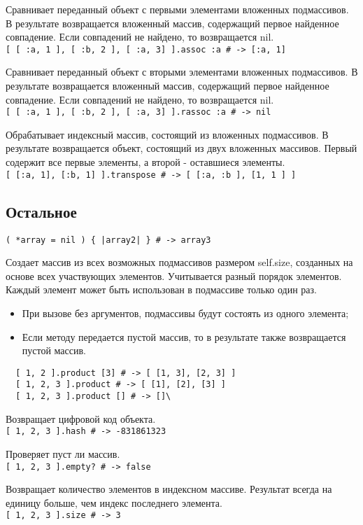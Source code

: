 \begin{methodlist}
  Сравнивает переданный объект с первыми элементами вложенных подмассивов. В результате возвращается вложенный массив, содержащий первое найденное совпадение. Если совпадений не найдено, то возвращается nil. 
  \\\verb![ [ :a, 1 ], [ :b, 2 ], [ :a, 3] ].assoc :a # -> [:a, 1]!

  Сравнивает переданный объект с вторыми элементами вложенных подмассивов. В результате возвращается вложенный массив, содержащий первое найденное совпадение. Если совпадений не найдено, то возвращается nil. 
  \\\verb![ [ :a, 1 ], [ :b, 2 ], [ :a, 3] ].rassoc :a # -> nil!
 
  Обрабатывает индексный массив, состоящий из вложенных подмассивов. В результате возвращается объект, состоящий из двух вложенных массивов. Первый содержит все первые элементы, а второй - оставшиеся элементы. 
  \\\verb![ [:a, 1], [:b, 1] ].transpose # -> [ [:a, :b ], [1, 1 ] ]!
\end{methodlist} 

\subsection*{Остальное}

\begin{methodlist}
  \verb!( *array = nil ) { |array2| } # -> array3!

  Создает массив из всех возможных подмассивов размером self.size, созданных на основе всех участвующих элементов. Учитывается разный порядок элементов. Каждый элемент может быть использован в подмассиве только один раз.
  \begin{itemize}
    \item При вызове без аргументов, подмассивы будут состоять из одного элемента;
    \item Если методу передается пустой массив, то в результате также возвращается пустой массив.
  \end{itemize}
  \begin{verbatim}
  [ 1, 2 ].product [3] # -> [ [1, 3], [2, 3] ]
  [ 1, 2, 3 ].product # -> [ [1], [2], [3] ] 
  [ 1, 2, 3 ].product [] # -> []\
  \end{verbatim}

  Возвращает цифровой код объекта. 
  \\\verb![ 1, 2, 3 ].hash # -> -831861323!

  Проверяет пуст ли массив. 
  \\\verb![ 1, 2, 3 ].empty? # -> false!

  Возвращает количество элементов в индексном массиве. Результат всегда на единицу больше, чем индекс последнего элемента. 
  \\\verb![ 1, 2, 3 ].size # -> 3!
 \end{methodlist}

